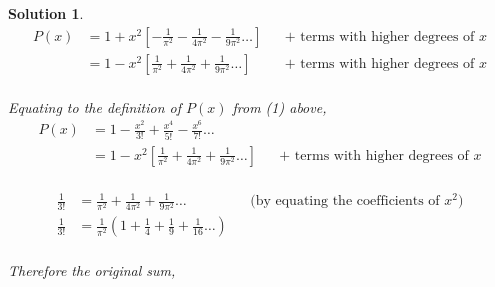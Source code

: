 \documentclass{article}
\newtheorem*{solution*}{Solution}
\begin{document}
\begin{solution*}
    \begin{align*}        
        P(x) &= 1 + x^2 [
            -\frac{1}{\pi^2}
            -\frac{1}{4\pi^2}
            -\frac{1}{9\pi^2}\dots]
        &&\text{+ terms with higher degrees of $x$}\\
        &= 1 - x^2 [
            \frac{1}{\pi^2}
            +\frac{1}{4\pi^2}
            +\frac{1}{9\pi^2}\dots]
        &&\text{+ terms with higher degrees of $x$}\\
    \end{align*}
    
    Equating to the definition of $P(x)$ from (1) above,\\

    \begin{align*}        
        P(x) &= 1-\frac{x^2}{3!}+\frac{x^4}{5!}-\frac{x^6}{7!}\dots\\
            &= 1 - x^2 [
                \frac{1}{\pi^2}
                +\frac{1}{4\pi^2}
                +\frac{1}{9\pi^2}\dots]
            &&\text{+ terms with higher degrees of $x$}\\
    \end{align*}

    \begin{align*}        
        \frac{1}{3!} &= 
            \frac{1}{\pi^2}
            +\frac{1}{4\pi^2}
            +\frac{1}{9\pi^2}\dots
        &&\text{(by equating the coefficients of $x^2$)}\\
        \frac{1}{3!} &= 
            \frac{1}{\pi^2}(1
            +\frac{1}{4}
            +\frac{1}{9}
            +\frac{1}{16}\dots
            )\\
    \end{align*}
    
    Therefore the original sum,
    \begin{center}
    \end{center}
\end{solution*}
\end{document}
